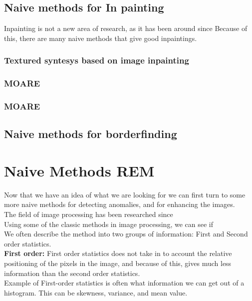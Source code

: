   \subsection{Naive methods for In painting}
    Inpainting is not a new area of research, as it has been around since %
    Because of this, there are many naive methods that give good inpaintings. 
    
    \subsubsection{Textured syntesys based on image inpainting}
    \subsubsection{MOARE}
    \subsubsection{MOARE}
   \subsection{Naive methods for borderfinding}

%
%
\section{Naive Methods REM}
      Now that we have an idea of what we are looking for we can first turn to some more naive methods for detecting anomalies, and for enhancing the images.\\
      The field of image processing has been researched since\\ %
      
      Using some of the classic methods in image processing, we can see if\\ %
      
      We often describe the method into two groups of information: First and Second order statistics.\\
      \textbf{First order:} First order statistics does not take in to account the relative positioning of the pixels in the image, and because of this, gives much less information than the second order statistics.\\
      Example of First-order statistics is often what information we can get out of a histogram. This can be skewness, variance, and mean value.\\
      
